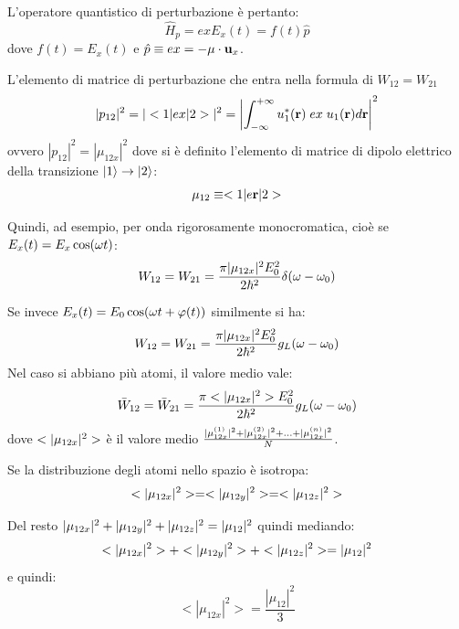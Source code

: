 L'operatore quantistico di perturbazione è pertanto:
\begin{equation}
    \hat{H}_p = e x E_x(t) = f(t) \hat{p}
\end{equation}
dove $f(t) = E_x(t)$ e $\hat{p} \equiv e x = -\mathbf{\mu} \cdot \mathbf{u}_x$.

L'elemento di matrice di perturbazione che entra nella formula di $W_{12} = W_{21}$
\begin{equation}
    |p_{12}|^2 = |<1|e x|2>|^2 = \left|\int_{-\infty}^{+\infty} u_1^*(\mathbf{r}) \; e x \; u_1(\mathbf{r}) d\mathbf{r} \right|^2
\end{equation}
ovvero $|p_{12}|^2 = |\mu_{12x}|^2$
dove si è definito l'elemento di matrice di dipolo elettrico della transizione $|1\rangle \rightarrow |2\rangle$:
\begin{equation}
    \mathbf{\mu}_{12} \equiv <1|e\mathbf{r}|2>
\end{equation}

Quindi, ad esempio, per onda rigorosamente monocromatica, cioè se $E_x(t) = E_x \cos(\omega t)$:
\begin{equation}
    W_{12} = W_{21} = \frac{\pi |\mu_{12x}|^2 E_0^2}{2 \hbar^2} \delta(\omega - \omega_0)
\end{equation}

Se invece $E_x(t) = E_0 \cos(\omega t + \varphi(t))$ similmente si ha:
\begin{equation}
    W_{12} = W_{21} = \frac{\pi |\*\mu_{12x}|^2 E_0^2}{2 \hbar^2} g_L(\w - \w_0)
\end{equation}
Nel caso si abbiano più atomi, il valore medio vale:
\begin{equation}
    \bar{W}_{12} = \bar{W}_{21} = \frac{\pi <|\*\mu_{12x}|^2> E_0^2}{2 \hbar^2} g_L(\omega - \omega_0)
\end{equation}
dove $<|\*\mu_{12x}|^2>$ è il valore medio $\frac{|\*\mu_{12x}^{(1)}|^2 + |\*\mu_{12x}^{(2)}|^2 + ... + |\*\mu_{12x}^{(n)}|^2}{N}$.

Se la distribuzione degli atomi nello spazio è isotropa:
\begin{equation}
    <|\*\mu_{12x}|^2> = <|\*\mu_{12y}|^2> = <|\*\mu_{12z}|^2>
\end{equation}

Del resto $|\*\mu_{12x}|^2 + |\*\mu_{12y}|^2 + |\*\mu_{12z}|^2 = |\*\mu_{12}|^2$ quindi mediando:
\begin{equation}
    <|\*\mu_{12x}|^2> + <|\*\mu_{12y}|^2> + <|\*\mu_{12z}|^2> = |\*\mu_{12}|^2
\end{equation}
e quindi:
\begin{equation}
    <|\mu_{12x}|^2> = \frac{|\mu_{12}|^2}{3}
\end{equation}

